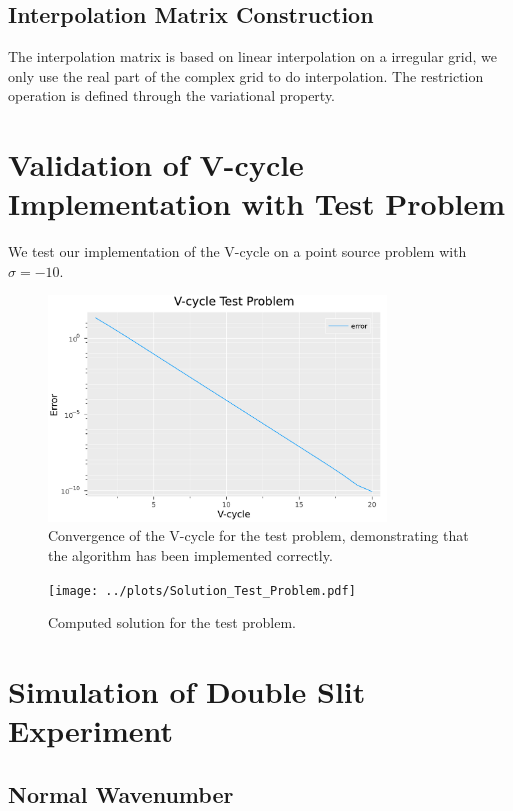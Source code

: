 \documentclass[a4paper,12pt]{article}
\begin{document}
\subsection{Interpolation Matrix Construction}

The interpolation matrix is based on linear interpolation on a irregular grid, we only use
the real part of the complex grid to do interpolation. The restriction operation is defined
through the variational property.

\section{Validation of V-cycle Implementation with Test Problem}

We test our implementation of the V-cycle on a point source problem with $\sigma = -10$.

\begin{figure}[h!]
    \centering
    \includegraphics[width=0.8\textwidth]{../plots/Vcycle_Test_Problem.pdf}
    \caption{Convergence of the V-cycle for the test problem, demonstrating that the algorithm has been implemented correctly.}
    \label{fig:../plots/Vcycle_Test_Problem.pdf}
\end{figure}

\begin{figure}[h!]
    \centering
    \texttt{[image: ../plots/Solution\_Test\_Problem.pdf]}
    \caption{Computed solution for the test problem.}
    \label{fig:Solution_Test_Problem}
\end{figure}

\section{Simulation of Double Slit Experiment}
\subsection{Normal Wavenumber}
\end{document}
